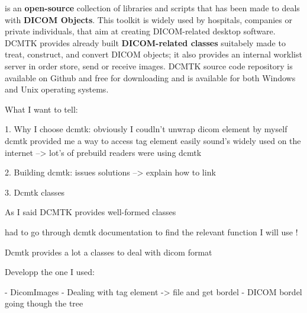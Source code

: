  is an \textbf{open-source} collection of libraries and scripts that has been made to deals with  \textbf{DICOM Objects}. This toolkit is widely used by hospitals, companies or private individuals, that aim at creating DICOM-related desktop software. DCMTK provides already built \textbf{DICOM-related classes} suitabely made to treat, construct, and convert DICOM objects; it also provides an internal worklist server in order store, send or receive images. DCMTK source code repository is available on Github and free for downloading and is available for both Windows and Unix operating systems. 


\newline \vspace{5mm}


What I want to tell:

1. Why I choose dcmtk: 
 obviously I coudln't unwrap dicom element by myself
 dcmtk provided me a way to access tag element easily
 sound's widely used on the internet --> lot's of prebuild readers were using dcmtk


\newline \vspace{5mm} 
 
2. Building dcmtk:
 issues 
 solutions --> explain how to link 
 
 
3. Dcmtk classes 

As I said DCMTK provides well-formed classes

had to go through dcmtk documentation to find the relevant function I will use ! 

Dcmtk provides a lot a classes to deal with dicom format 


Developp the one I used:

- DicomImages
- Dealing with tag element -> file and get bordel
- DICOM bordel going though the tree 
	